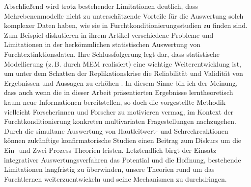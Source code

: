 	
	
	
	Abschließend wird trotz bestehender Limitationen deutlich, dass Mehrebenenmodelle nicht zu unterschätzende Vorteile für die Auswertung solch komplexer Daten haben, wie sie in Furchtkonditionierungsstudien zu finden sind. 
	Zum Beispiel diskutieren \textcite{NEY2018} in ihrem Artikel verschiedene Probleme und Limitationen in der herkömmlichen statistischen Auswertung von Furchtextinktionsdaten. Ihre Schlussfolgerung legt dar, dass statistische Modellierung (z.\,B. durch MEM realisiert) eine wichtige Weiterentwicklung ist, um unter dem Schatten %
	der Replikationskrise die Reliabilität und Validität von Ergebnissen und Aussagen zu erhöhen \parencite{NEY2018}.
	In diesem Sinne bin ich der Meinung, dass auch wenn die in dieser Arbeit präsentierten Ergebnisse lerntheoretisch kaum neue Informationen bereitstellen, so doch die vorgestellte Methodik vielleicht Forscherinnen und Forscher zu motivieren vermag, im Kontext der Furchtkonditionierung konkreten multivariaten Fragestellungen nachzugehen. 
	Durch die simultane Auswertung von Hautleitwert- und Schreckreaktionen können zukünftige konfirmatorische Studien einen Beitrag zum Diskurs um die Ein- und Zwei-Prozess-Theorien leisten. 
 	Letztendlich birgt der Einsatz integrativer Auswertungsverfahren das Potential und die Hoffnung, bestehende  Limitationen langfristig zu überwinden, unsere Theorien rund um das Furchtlernen weiterzuentwickeln und seine Mechanismen zu durchdringen. 





